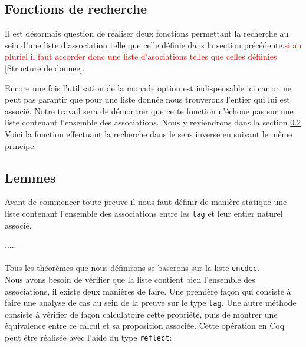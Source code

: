\documentclass {article}
\newcommand{\codefrom}[3]
           {}
\theoremstyle{definition}
\theoremstyle{remark}
\newcommand{\todo}[1]{\textcolor{red}{#1}}
\newcommand{\fun}[1]{\lstinline!#1!}
\begin{document}
\subsection{Fonctions de recherche}

Il est désormais question de réaliser deux fonctions permettant la recherche
au sein d'une liste d'association telle  que celle définie dans la section précédente.\todo {si au pluriel il faut accorder donc une liste d'asociations telles que celles défiinies}
\ref{Structure de donnee}.

\codefrom{src}{association_list}{lookup}

Encore une fois l'utilisation de la monade option est indispensable ici car
on ne peut pas garantir que pour une liste donnée nous trouverons l'entier
qui lui est associé. Notre travail sera de démontrer que cette fonction n'échoue pas
sur une liste contenant l'ensemble des associations. Nous y reviendrons dans la section
\ref{Lemmeslol}
Voici la fonction effectuant la recherche dans le sens inverse en suivant le même principe:

\codefrom{src}{association_list}{lookdown}



\subsection{Lemmes}
\label{Lemmeslol}

Avant de commencer toute preuve il nous faut définir de manière statique une liste
contenant l'ensemble des associations entre les \fun{tag} et leur entier naturel associé.


\codefrom{src}{association_list}{encdec}
.....\\ \\

Tous les théorèmes que nous définirons se baserons sur la liste \fun{encdec}. \\
Nous avons besoin de vérifier que la liste contient bien l'ensemble des associations,
il existe deux manières de faire. Une première façon qui consiste à faire une analyse de cas
au sein de la preuve sur le type \fun{tag}.
Une autre méthode consiste à vérifier de façon calculatoire cette propriété, puis de montrer
une équivalence entre ce calcul et sa proposition associée. 
Cette opération en Coq peut être réalisée avec l'aide du type \fun{reflect}:

\codefrom{rapport}{definitions}{reflect}
\end{document}
